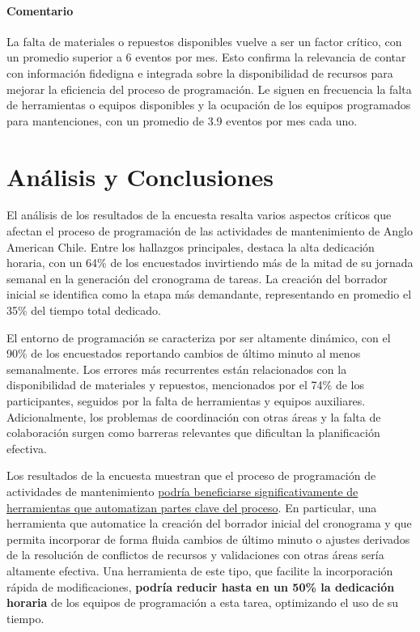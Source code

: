 \documentclass{article}
\begin{document}
\begin{appendix}
    \paragraph{Comentario}La falta de materiales o repuestos disponibles vuelve a ser un factor crítico, con un promedio superior a 6 eventos por mes. Esto confirma la relevancia de contar con información fidedigna e integrada sobre la disponibilidad de recursos para mejorar la eficiencia del proceso de programación. Le siguen en frecuencia la falta de herramientas o equipos disponibles y la ocupación de los equipos programados para mantenciones, con un promedio de 3.9 eventos por mes cada uno.
    
    \section*{Análisis y Conclusiones}
    
    El análisis de los resultados de la encuesta resalta varios aspectos críticos que afectan el proceso de programación de las actividades de mantenimiento de Anglo American Chile. Entre los hallazgos principales, destaca la alta dedicación horaria, con un 64\% de los encuestados invirtiendo más de la mitad de su jornada semanal en la generación del cronograma de tareas. La creación del borrador inicial se identifica como la etapa más demandante, representando en promedio el 35\% del tiempo total dedicado.
    
    El entorno de programación se caracteriza por ser altamente dinámico, con el 90\% de los encuestados reportando cambios de último minuto al menos semanalmente. Los errores más recurrentes están relacionados con la disponibilidad de materiales y repuestos, mencionados por el 74\% de los participantes, seguidos por la falta de herramientas y equipos auxiliares. Adicionalmente, los problemas de coordinación con otras áreas y la falta de colaboración surgen como barreras relevantes que dificultan la planificación efectiva.
    
    Los resultados de la encuesta muestran que el proceso de programación de actividades de mantenimiento \uline{podría beneficiarse significativamente de herramientas que automatizan partes clave del proceso}. En particular, una herramienta que automatice la creación del borrador inicial del cronograma y que permita incorporar de forma fluida cambios de último minuto o ajustes derivados de la resolución de conflictos de recursos y validaciones con otras áreas sería altamente efectiva. Una herramienta de este tipo, que facilite la incorporación rápida de modificaciones, \textbf{podría reducir hasta en un 50\% la dedicación horaria} de los equipos de programación a esta tarea, optimizando el uso de su tiempo.
    

\end{appendix}
\end{document}
